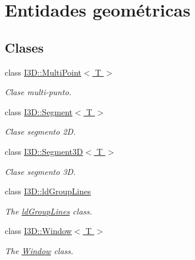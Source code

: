 \hypertarget{group___geometric_entities}{}\section{Entidades geométricas}
\label{group___geometric_entities}
\subsection*{Clases}
\begin{DoxyCompactItemize}
\item 
class \hyperlink{class_i3_d_1_1_multi_point}{I3\+D\+::\+Multi\+Point$<$ T $>$}
\begin{DoxyCompactList}\small\item\em Clase multi-\/punto. \end{DoxyCompactList}\item 
class \hyperlink{class_i3_d_1_1_segment}{I3\+D\+::\+Segment$<$ T $>$}
\begin{DoxyCompactList}\small\item\em Clase segmento 2D. \end{DoxyCompactList}\item 
class \hyperlink{class_i3_d_1_1_segment3_d}{I3\+D\+::\+Segment3\+D$<$ T $>$}
\begin{DoxyCompactList}\small\item\em Clase segmento 3D. \end{DoxyCompactList}\item 
class \hyperlink{class_i3_d_1_1ld_group_lines}{I3\+D\+::ld\+Group\+Lines}
\begin{DoxyCompactList}\small\item\em The \hyperlink{class_i3_d_1_1ld_group_lines}{ld\+Group\+Lines} class. \end{DoxyCompactList}\item 
class \hyperlink{class_i3_d_1_1_window}{I3\+D\+::\+Window$<$ T $>$}
\begin{DoxyCompactList}\small\item\em The \hyperlink{class_i3_d_1_1_window}{Window} class. \end{DoxyCompactList}\end{DoxyCompactItemize}
